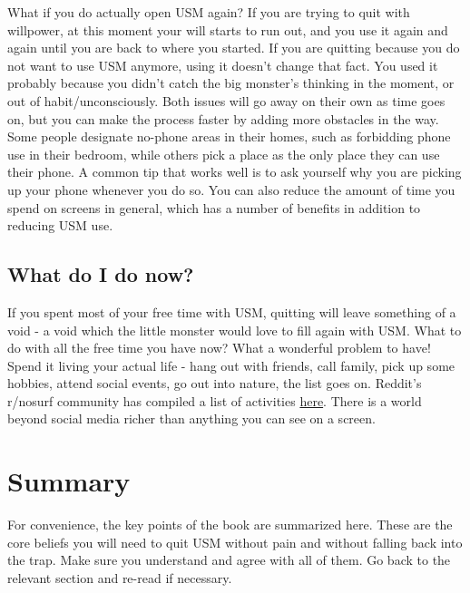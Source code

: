 \documentclass[
]{book}
\begin{document}
What if you do actually open USM again? If you are trying to quit with willpower, at this moment your will starts to run out, and you use it again and again until you are back to where you started. If you are quitting because you do not want to use USM anymore, using it doesn't change that fact. You used it probably because you didn't catch the big monster's thinking in the moment, or out of habit/unconsciously. Both issues will go away on their own as time goes on, but you can make the process faster by adding more obstacles in the way. Some people designate no-phone areas in their homes, such as forbidding phone use in their bedroom, while others pick a place as the only place they can use their phone. A common tip that works well is to ask yourself why you are picking up your phone whenever you do so. You can also reduce the amount of time you spend on screens in general, which has a number of benefits in addition to reducing USM use.

\section{What do I do now?}\label{what-do-i-do-now}

If you spent most of your free time with USM, quitting will leave something of a void - a void which the little monster would love to fill again with USM. What to do with all the free time you have now? What a wonderful problem to have! Spend it living your actual life - hang out with friends, call family, pick up some hobbies, attend social events, go out into nature, the list goes on. Reddit's r/nosurf community has compiled a list of activities \href{https://www.reddit.com/r/nosurf/wiki/activities/}{here}. There is a world beyond social media richer than anything you can see on a screen.

\chapter{Summary}\label{summary}

For convenience, the key points of the book are summarized here. These are the core beliefs you will need to quit USM without pain and without falling back into the trap. Make sure you understand and agree with all of them. Go back to the relevant section and re-read if necessary.
\end{document}
